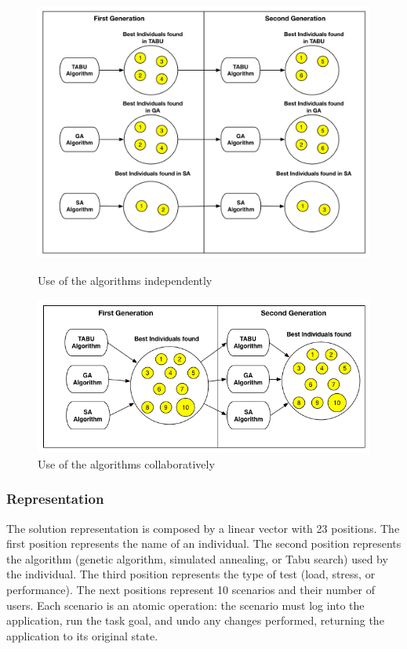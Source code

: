 \begin{figure}[h]
\begin{minipage}{.5\textwidth}
\centering
\includegraphics[width=1\textwidth]{./images/independ.png}
\caption{Use of the algorithms independently \citep{Gois2016}}
\label{fig:firstaproach}
\end{minipage}
\begin{minipage}{.5\textwidth}
\centering
\includegraphics[width=1\textwidth]{./images/collaborative.png}
\caption{Use of the  algorithms collaboratively \citep{Gois2016}}
\label{fig:secondapproach}
\end{minipage}
\end{figure}

\subsubsection{Representation}

The solution representation is composed by a linear vector with 23 positions. The first position represents the name of an individual. The second position represents the algorithm (genetic algorithm, simulated annealing, or Tabu search) used by the individual. The third position represents the type of test (load, stress, or performance). The next positions represent 10 scenarios and their number of users. Each scenario is an atomic operation: the scenario must log into the application, run the task goal, and undo any changes performed, returning the application to its original state.

